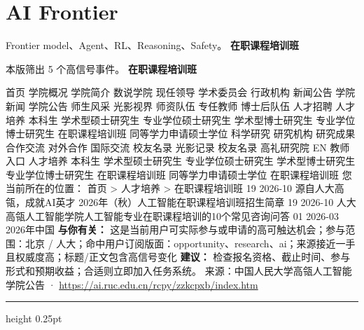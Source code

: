 \documentclass[10.5pt]{ctexart}
\begin{document}
\section*{AI Frontier}
{\color{ormuted} Frontier model、Agent、RL、Reasoning、Safety。}
\vspace{2mm}
{\LARGE\bfseries 在职课程培训班}\par
\vspace{1mm}
{\color{ormuted} 本版筛出 5 个高信号事件。}
\vspace{3mm}
{\Large\bfseries 在职课程培训班}\par
首页 学院概况 学院简介 数说学院 现任领导 学术委员会 行政机构 新闻公告 学院新闻 学院公告 师生风采 光影视界 师资队伍 专任教师 博士后队伍 人才招聘 人才培养 本科生 学术型硕士研究生 专业学位硕士研究生 学术型博士研究生 专业学位博士研究生 在职课程培训班 同等学力申请硕士学位 科学研究 研究机构 研究成果 合作交流 对外合作 国际交流 校友名录 光影记录 校友名录 高礼研究院 EN 教师入口 人才培养 本科生 学术型硕士研究生 专业学位硕士研究生 学术型博士研究生 专业学位博士研究生 在职课程培训班 同等学力申请硕士学位 在职课程培训班 您当前所在的位置： 首页 > 人才培养 > 在职课程培训班 19 2026-10 源自人大高瓴，成就AI英才 2026年（秋）人工智能在职课程培训班招生简章 19 2026-10 人大高瓴人工智能学院人工智能专业在职课程培训的10个常见咨询问答 01 2026-03 2026年中国
\textbf{与你有关：} 这是当前用户可实际参与或申请的高可触达机会；参与范围：北京 / 人大；命中用户订阅版面：opportunity、research、ai；来源接近一手且权威度高；标题/正文包含高信号变化
\textbf{建议：} 检查报名资格、截止时间、参与形式和预期收益；合适则立即加入任务系统。
{\footnotesize\color{ormuted} 来源：中国人民大学高瓴人工智能学院公告 · \url{https://ai.ruc.edu.cn/rcpy/zzkcpxb/index.htm}}
\vspace{4mm}
\hrule height 0.25pt
\vspace{3mm}
\end{document}
